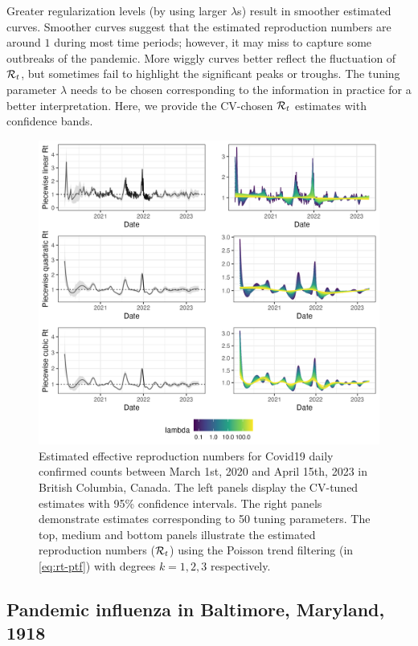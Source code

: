 Greater regularization levels (by using larger $\lambda$s) result in smoother
estimated curves. Smoother curves suggest that the estimated reproduction
numbers are around $1$ during most time periods; however, it may miss to capture
some outbreaks of the pandemic. More wiggly curves better reflect the
fluctuation of $\mathcal{R}_t$, but sometimes fail to highlight the significant peaks
or troughs. The tuning parameter $\lambda$ needs to be chosen corresponding to
the information in practice for a better interpretation. Here, we provide the
CV-chosen $\mathcal{R}_t$ estimates with confidence bands. 

\begin{figure}[tb]
    \centering
    \includegraphics[width=0.9\linewidth]{fig/covid_full_res.png}
    \caption{Estimated effective reproduction numbers for Covid19 daily confirmed counts between March 1st, 2020 and April 15th, 2023 in British Columbia, Canada. The left panels display the CV-tuned estimates with 95\% confidence intervals. The right panels demonstrate estimates corresponding to 50 tuning parameters. The top, medium and bottom panels illustrate the estimated reproduction numbers ($\mathcal{R}_t$) using the Poisson trend filtering (in \eqref{eq:rt-ptf}) with degrees $k=1,2,3$ respectively.} 
    \label{fig:covid-rt}
\end{figure} 


\subsection{Pandemic influenza in Baltimore, Maryland, 1918}

